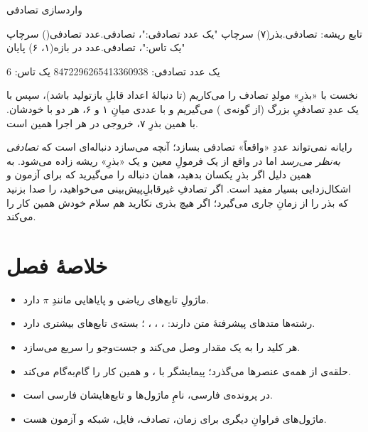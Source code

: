 \begin{salamfa}
واردسازی تصادفی

تابع ریشه:
    تصادفی.بذر(۷)
    سرچاپ "یک عدد تصادفی:"، تصادفی.عدد تصادفی()
    سرچاپ "یک تاس:"، تصادفی.عدد در بازه(۱، ۶)
پایان
\end{salamfa}

\begin{progoutfa}
یک عدد تصادفی: 8472296265413360938
یک تاس: 6
\end{progoutfa}

نخست با  «بذرِ» مولدِ تصادف را می‌کاریم (تا دنبالهٔ اعداد قابلِ
بازتولید باشد)، سپس با  یک عددِ تصادفیِ بزرگ (از گونه‌ی
) می‌گیریم و با  عددی میانِ ۱ و ۶،
هر دو با خودشان. با همین بذرِ ۷، خروجی در هر اجرا همین است.

\begin{deep}
رایانه نمی‌تواند عددِ «واقعاً» تصادفی بسازد؛ آنچه می‌سازد دنباله‌ای است که
\emph{تصادفی به‌نظر می‌رسد} اما در واقع از یک فرمولِ معین و یک «بذرِ» ریشه
زاده می‌شود. به همین دلیل اگر بذرِ یکسان بدهید، همان دنباله را می‌گیرید که
برای آزمون و اشکال‌زدایی بسیار مفید است. اگر تصادفِ غیرقابلِ‌پیش‌بینی
می‌خواهید،  را صدا بزنید که بذر را از زمانِ جاری
می‌گیرد؛ اگر هیچ بذری نکارید هم سلام خودش همین کار را می‌کند.
\end{deep}

\section{خلاصهٔ فصل}

\begin{itemize}
  \item ماژولِ  تابع‌های ریاضی و پایاهایی مانندِ $\pi$ دارد.
  \item رشته‌ها متدهای پیشرفتهٔ متن دارند: ، ،
        ، ؛ بسته‌ی  تابع‌های بیشتری دارد.
  \item {} هر کلید را به یک مقدار وصل می‌کند و جست‌وجو را سریع
        می‌سازد.
  \item حلقه‌ی  از همه‌ی عنصرها می‌گذرد؛
        پیمایشگر با ،  و  همین کار را
        گام‌به‌گام می‌کند.
  \item در پرونده‌ی فارسی، نامِ ماژول‌ها و تابع‌هایشان فارسی است.
  \item ماژول‌های فراوانِ دیگری برای زمان، تصادف، فایل، شبکه و آزمون هست.
\end{itemize}

